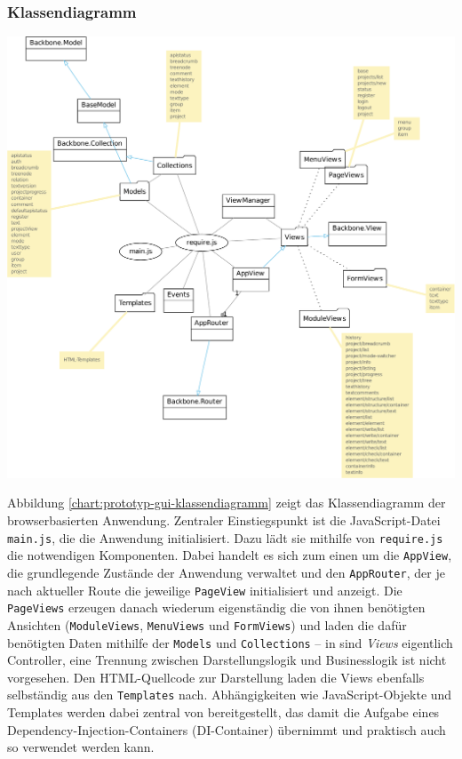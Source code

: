\subsubsection{Klassendiagramm}

\begin{center}
\includegraphics[width=\textwidth]{media/prototyp-gui-klassendiagramm.pdf}
\label{chart:prototyp-gui-klassendiagramm}
\end{center}

Abbildung \ref{chart:prototyp-gui-klassendiagramm} zeigt das Klassendiagramm der browserbasierten Anwendung. Zentraler Einstiegspunkt ist die JavaScript-Datei \texttt{main.js}, die die Anwendung initialisiert. Dazu lädt sie mithilfe von \texttt{require.js} die notwendigen Komponenten. Dabei handelt es sich zum einen um die \texttt{AppView}, die grundlegende Zustände der Anwendung verwaltet und den \texttt{AppRouter}, der je nach aktueller Route die jeweilige \texttt{PageView} initialisiert und anzeigt. Die \texttt{PageViews} erzeugen danach wiederum eigenständig die von ihnen benötigten Ansichten (\texttt{ModuleViews}, \texttt{MenuViews} und \texttt{FormViews}) und laden die dafür benötigten Daten mithilfe der \texttt{Models} und \texttt{Collections} -- in  sind \emph{Views} eigentlich Controller, eine Trennung zwischen Darstellungslogik und Businesslogik ist nicht vorgesehen. Den HTML-Quellcode zur Darstellung laden die Views ebenfalls selbständig aus den \texttt{Templates} nach. Abhängigkeiten wie JavaScript-Objekte und Templates werden dabei zentral von  bereitgestellt, das damit die Aufgabe eines Dependency-Injection-Containers (DI-Container) übernimmt und praktisch auch so verwendet werden kann.

